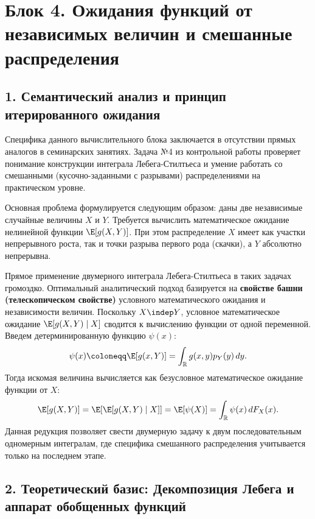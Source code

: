 \section*{Блок 4. Ожидания функций от независимых величин и смешанные распределения}

\subsection*{1. Семантический анализ и принцип итерированного ожидания}

Специфика данного вычислительного блока заключается в отсутствии прямых аналогов в семинарских занятиях. Задача №4 из контрольной работы проверяет понимание конструкции интеграла Лебега-Стилтьеса и умение работать со смешанными (кусочно-заданными с разрывами) распределениями на практическом уровне. 

Основная проблема формулируется следующим образом: даны две независимые случайные величины $X$ и $Y$. Требуется вычислить математическое ожидание нелинейной функции $\E[g(X, Y)]$. При этом распределение $X$ имеет как участки непрерывного роста, так и точки разрыва первого рода (скачки), а $Y$ абсолютно непрерывна.

Прямое применение двумерного интеграла Лебега-Стилтьеса в таких задачах громоздко. Оптимальный аналитический подход базируется на \textbf{свойстве башни (телескопическом свойстве)} условного математического ожидания и независимости величин. Поскольку $X \indep Y$, условное математическое ожидание $\E[g(X, Y) \mid X]$ сводится к вычислению функции от одной переменной. Введем детерминированную функцию $\psi(x)$:
\[
    \psi(x) \coloneqq \E[g(x, Y)] = \int_{\mathbb{R}} g(x, y) p_Y(y) \, dy.
\]
Тогда искомая величина вычисляется как безусловное математическое ожидание функции от $X$:
\[
    \E[g(X, Y)] = \E[\E[g(X, Y) \mid X]] = \E[\psi(X)] = \int_{\mathbb{R}} \psi(x) \, dF_X(x).
\]
Данная редукция позволяет свести двумерную задачу к двум последовательным одномерным интегралам, где специфика смешанного распределения учитывается только на последнем этапе.

\subsection*{2. Теоретический базис: Декомпозиция Лебега и аппарат обобщенных функций}

